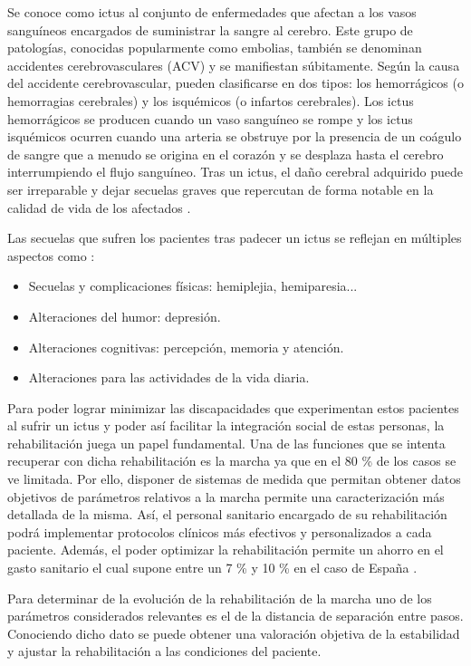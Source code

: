 Se conoce como ictus al conjunto de enfermedades que afectan a los vasos sanguíneos encargados de suministrar la sangre al cerebro. Este grupo de patologías, conocidas popularmente como embolias, también se denominan accidentes cerebrovasculares (ACV) y se manifiestan súbitamente. Según la causa del accidente cerebrovascular, pueden clasificarse en dos tipos: los hemorrágicos (o hemorragias cerebrales) y los isquémicos (o infartos cerebrales). Los ictus hemorrágicos se producen cuando un vaso sanguíneo se rompe y los ictus isquémicos ocurren cuando una arteria se obstruye por la presencia de un coágulo de sangre que a menudo se origina en el corazón y se desplaza hasta el cerebro interrumpiendo el flujo sanguíneo. Tras un ictus, el daño cerebral adquirido puede ser irreparable y dejar secuelas graves que repercutan de forma notable en la calidad de vida de los afectados \cite{ictus_def}.

Las secuelas que sufren los pacientes tras padecer un ictus se reflejan en múltiples aspectos como \cite{secuelas} :
\begin{itemize}
	\item Secuelas y complicaciones físicas: hemiplejia, hemiparesia...
	\item Alteraciones del humor: depresión.
	\item Alteraciones cognitivas: percepción, memoria y atención.
	\item Alteraciones para las actividades de la vida diaria.
\end{itemize}

Para poder lograr minimizar las discapacidades que experimentan estos pacientes al sufrir un ictus y poder así facilitar la integración social de estas personas, la rehabilitación juega un papel fundamental. Una de las funciones que se intenta recuperar con dicha rehabilitación es la marcha ya que en el 80 \% de los casos se ve limitada. Por ello, disponer de sistemas de medida que permitan obtener datos objetivos de parámetros relativos a la marcha permite una caracterización más detallada de la misma. Así, el personal sanitario encargado de su rehabilitación podrá implementar protocolos clínicos más efectivos y personalizados a cada paciente. Además, el poder optimizar la rehabilitación permite un ahorro en el gasto sanitario el cual supone entre un 7 \% y 10 \% en el caso de España \cite{gasto}.

Para determinar de la evolución de la rehabilitación de la marcha uno de los parámetros considerados relevantes es el de la distancia de separación entre pasos. Conociendo dicho dato se puede obtener una valoración objetiva de la estabilidad y ajustar la rehabilitación a las condiciones del paciente.

